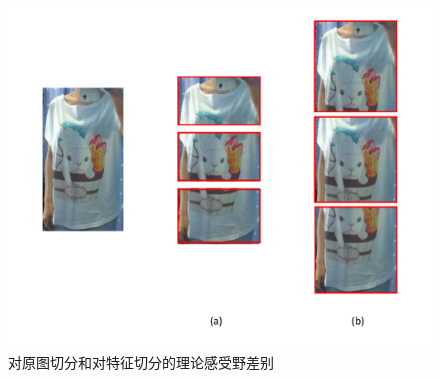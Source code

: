 \begin{figure}[h]
  \centering
  \includegraphics[width=0.8\linewidth]{Img/RFcmp.pdf}
  \caption{对原图切分和对特征切分的理论感受野差别}
  \label{fig:RFcmp}
\end{figure}
